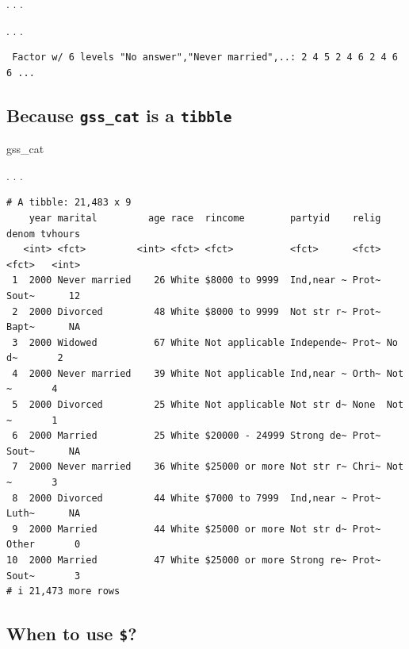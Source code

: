 \documentclass[
  letterpaper,
  DIV=11,
  numbers=noendperiod,
  oneside]{scrartcl}
\newenvironment{Shaded}{\begin{snugshade}}{\end{snugshade}}
\newcommand{\FunctionTok}[1]{\textcolor[rgb]{0.28,0.35,0.67}{#1}}
\newcommand{\NormalTok}[1]{\textcolor[rgb]{0.00,0.23,0.31}{#1}}
\newcommand{\SpecialCharTok}[1]{\textcolor[rgb]{0.37,0.37,0.37}{#1}}
\begin{document}
. . .

\begin{Shaded}
\end{Shaded}

. . .

\begin{verbatim}
 Factor w/ 6 levels "No answer","Never married",..: 2 4 5 2 4 6 2 4 6 6 ...
\end{verbatim}

\hypertarget{because-gss_cat-is-a-tibble}{%
\subsection{\texorpdfstring{Because \texttt{gss\_cat} is a
\texttt{tibble}}{Because gss\_cat is a tibble}}\label{because-gss_cat-is-a-tibble}}

\begin{Shaded}
\begin{Highlighting}[]
\NormalTok{gss\_cat}
\end{Highlighting}
\end{Shaded}

. . .

\begin{verbatim}
# A tibble: 21,483 x 9
    year marital         age race  rincome        partyid    relig denom tvhours
   <int> <fct>         <int> <fct> <fct>          <fct>      <fct> <fct>   <int>
 1  2000 Never married    26 White $8000 to 9999  Ind,near ~ Prot~ Sout~      12
 2  2000 Divorced         48 White $8000 to 9999  Not str r~ Prot~ Bapt~      NA
 3  2000 Widowed          67 White Not applicable Independe~ Prot~ No d~       2
 4  2000 Never married    39 White Not applicable Ind,near ~ Orth~ Not ~       4
 5  2000 Divorced         25 White Not applicable Not str d~ None  Not ~       1
 6  2000 Married          25 White $20000 - 24999 Strong de~ Prot~ Sout~      NA
 7  2000 Never married    36 White $25000 or more Not str r~ Chri~ Not ~       3
 8  2000 Divorced         44 White $7000 to 7999  Ind,near ~ Prot~ Luth~      NA
 9  2000 Married          44 White $25000 or more Not str d~ Prot~ Other       0
10  2000 Married          47 White $25000 or more Strong re~ Prot~ Sout~       3
# i 21,473 more rows
\end{verbatim}

\hypertarget{when-to-use}{%
\subsection{\texorpdfstring{When to use
\texttt{\$}?}{When to use \$?}}\label{when-to-use}}
\end{document}
